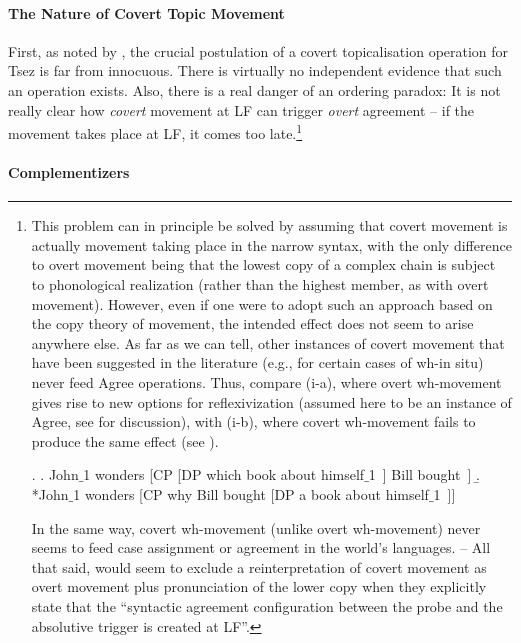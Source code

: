 \documentclass[output=paper
,modfonts
,nonflat]{langsci/langscibook}
\begin{document}
\paragraph{The Nature of Covert Topic Movement}

First, as noted by \cite{Boskovic:07}, the crucial postulation of a
covert topicalisation operation for Tsez is far from innocuous. There
is virtually no independent evidence that such an operation
exists. Also, there is a real danger of an ordering paradox: It is not
really clear how {\it covert} movement at LF can trigger {\it overt}
agreement -- if the movement takes place at LF, it comes too
late.\footnote{This problem  can in principle be solved by assuming
  that covert movement is actually movement taking place in the
  narrow syntax, with the only difference to overt movement being that
  the lowest copy of a complex chain is subject to phonological
  realization (rather than the highest member, as with overt movement).
However, even if one were to adopt such an approach based on the copy
theory of movement, the intended effect does not seem to arise
anywhere else. As far as we can tell, other instances of covert
movement that have been suggested in the literature (e.g., for certain
cases of wh-in situ) never feed Agree operations. Thus, compare (i-a),
where overt wh-movement gives rise to new options for reflexivization
(assumed here to be an instance of Agree, see \cite{Reuland:11} for
discussion), with (i-b), where covert wh-movement fails to produce the
same effect (see \cite{Barss:86}). 

\Lsciexi.
 \a. John$\_$1 wonders [CP [DP which book about himself$\_$1~] Bill bought~]
\b. *John$\_$1 wonders [CP why Bill bought [DP a book about himself$\_$1~]]

In the same way, covert wh-movement (unlike overt wh-movement) never seems to feed case
assignment or agreement in the world's languages. -- 
All  that said,  would seem to 
exclude a reinterpretation of covert movement as overt movement plus
pronunciation of the lower copy when they explicitly state that the
``syntactic agreement configuration between the probe and the
absolutive trigger is created at LF''.}


\paragraph{Complementizers}
\end{document}

